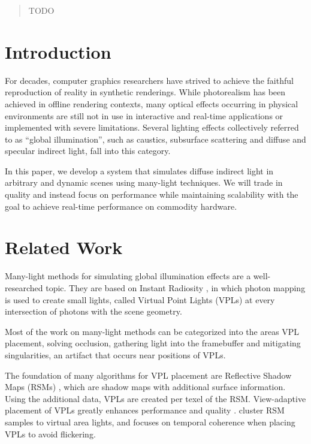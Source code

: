 

\begin{abstract}
TODO
\end{abstract}



\section{Introduction}
For decades, computer graphics researchers have strived to achieve the faithful reproduction of reality in synthetic renderings. While photorealism has been achieved in offline rendering contexts, many optical effects occurring in physical environments are still not in use in interactive and real-time applications or implemented with severe limitations. Several lighting effects collectively referred to as ``global illumination'', such as caustics, subsurface scattering and diffuse and specular indirect light, fall into this category.

In this paper, we develop a system that simulates diffuse indirect light in arbitrary and dynamic scenes using many-light techniques. We will trade in quality and instead focus on performance while maintaining scalability with the goal to achieve real-time performance on commodity hardware.




\section{Related Work}

Many-light methods for simulating global illumination effects are a well-researched topic. They are based on Instant Radiosity \cite{Keller:1997:InstantRadiosity}, in which photon mapping is used to create small lights, called Virtual Point Lights (VPLs) at every intersection of photons with the scene geometry.


Most of the work on many-light methods can be categorized into the areas VPL placement, solving occlusion, gathering light into the framebuffer and mitigating singularities, an artifact that occurs near positions of VPLs.


The foundation of many algorithms for VPL placement are Reflective Shadow Maps (RSMs) \cite{Dachsbacher:2005:RSM}, which are shadow maps with additional surface information. Using the additional data, VPLs are created per texel of the RSM. View-adaptive placement of VPLs greatly enhances performance and quality \cite{ritschel2011ismsViewAdaptive}. \cite{prutkin2012reflective} cluster RSM samples to virtual area lights, and \cite{hedman2016sequential} focuses on temporal coherence when placing VPLs to avoid flickering.

